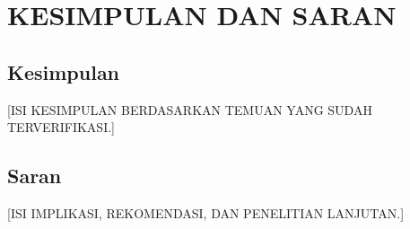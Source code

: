 \chapter[KESIMPULAN DAN SARAN]{\\ KESIMPULAN DAN SARAN}
\section{Kesimpulan}
[ISI KESIMPULAN BERDASARKAN TEMUAN YANG SUDAH TERVERIFIKASI.]

\section{Saran}
[ISI IMPLIKASI, REKOMENDASI, DAN PENELITIAN LANJUTAN.]
